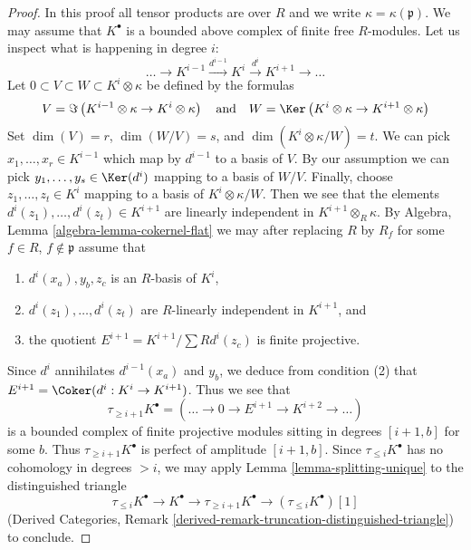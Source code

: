 \begin{proof}
In this proof all tensor products are over $R$ and we write
$\kappa = \kappa(\mathfrak p)$. We may assume that $K^\bullet$
is a bounded above complex of finite free $R$-modules. Let us
inspect what is happening in degree $i$:
$$
\ldots \to K^{i - 1} \xrightarrow{d^{i - 1}} K^i \xrightarrow{d^i}
K^{i + 1} \to \ldots
$$
Let $0 \subset V \subset W \subset K^i \otimes \kappa$ be defined
by the formulas
$$
V = \Im\left(
K^{i - 1} \otimes \kappa \to K^i \otimes \kappa
\right)
\quad\text{and}\quad
W = \Ker\left(
K^i \otimes \kappa \to K^{i + 1} \otimes \kappa
\right)
$$
Set $\dim(V) = r$, $\dim(W/V) = s$, and $\dim(K^i \otimes \kappa/W) = t$.
We can pick $x_1, \ldots, x_r \in K^{i - 1}$ which map by $d^{i - 1}$
to a basis of $V$. By our assumption we can pick
$y_1, \ldots, y_s \in \Ker(d^i)$ mapping to a basis of $W/V$.
Finally, choose $z_1, \ldots, z_t \in K^i$ mapping to a basis of
$K^i \otimes \kappa/W$. Then we see that the elements
$d^i(z_1), \ldots, d^i(z_t) \in K^{i + 1}$ are linearly independent
in $K^{i + 1} \otimes_R \kappa$.
By Algebra, Lemma \ref{algebra-lemma-cokernel-flat} we may after replacing
$R$ by $R_f$ for some $f \in R$, $f \not \in \mathfrak p$ assume that
\begin{enumerate}
\item $d^i(x_a), y_b, z_c$ is an $R$-basis of $K^i$,
\item $d^i(z_1), \ldots, d^i(z_t)$ are $R$-linearly independent in
$K^{i + 1}$, and
\item the quotient $E^{i + 1} = K^{i + 1}/\sum Rd^i(z_c)$ is finite projective.
\end{enumerate}
Since $d^i$ annihilates $d^{i - 1}(x_a)$ and $y_b$, we deduce from
condition (2) that $E^{i + 1} = \Coker(d^i : K^i \to K^{i + 1})$.
Thus we see that
$$
\tau_{\geq i + 1}K^\bullet =
(\ldots \to 0 \to E^{i + 1} \to K^{i + 2} \to \ldots)
$$
is a bounded complex of finite projective modules sitting in degrees
$[i + 1, b]$ for some $b$. Thus $\tau_{\geq i + 1}K^\bullet$ is perfect
of amplitude $[i + 1, b]$. Since $\tau_{\leq i}K^\bullet$ has no
cohomology in degrees $> i$, we may apply Lemma \ref{lemma-splitting-unique}
to the distinguished triangle
$$
\tau_{\leq i}K^\bullet \to K^\bullet \to \tau_{\geq i + 1}K^\bullet \to
(\tau_{\leq i}K^\bullet)[1]
$$
(Derived Categories, Remark
\ref{derived-remark-truncation-distinguished-triangle}) to conclude.
\end{proof}

